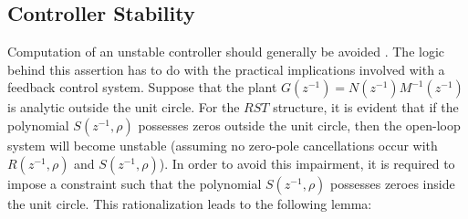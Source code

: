 \documentclass[journal]{IEEEtran}
\newtheorem{lemma}{Lemma}
\begin{document}

%
%
%

\subsection{Controller Stability}
\label{sec:con_stab}
Computation of an unstable controller should generally be avoided \cite{LZ06}. The logic behind this assertion has to do with the practical implications involved with a feedback control system.  Suppose that the plant $G(z^{-1}) = N(z^{-1})M^{-1}(z^{-1})$ is analytic outside the unit circle. For the $RST$ structure, it is evident that if the polynomial $S(z^{-1},\rho)$ possesses zeros outside the unit circle, then the open-loop system will become unstable (assuming no zero-pole cancellations occur with $R(z^{-1},\rho)$ and $S(z^{-1},\rho)$). In order to avoid this impairment, it is required to impose a constraint such that the polynomial $S(z^{-1},\rho)$ possesses zeroes inside the unit circle. This rationalization leads to the following lemma:
\end{document}
